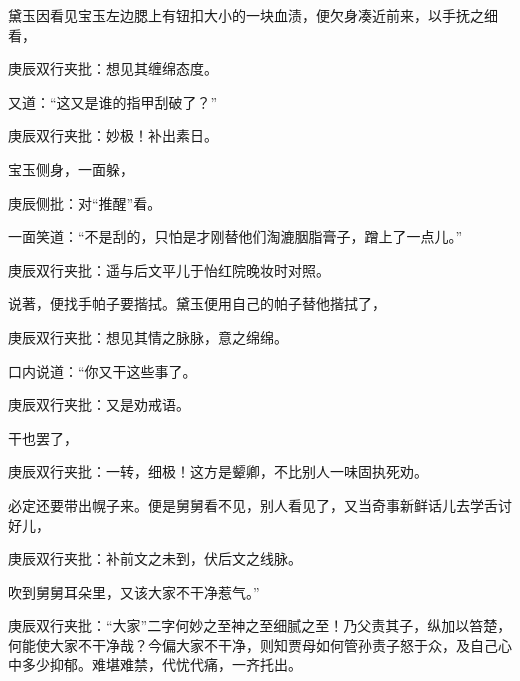 \begin{parag}
    黛玉因看见宝玉左边腮上有钮扣大小的一块血渍，便欠身凑近前来，以手抚之细看，\begin{note}庚辰双行夹批：想见其缠绵态度。\end{note}又道：“这又是谁的指甲刮破了？”\begin{note}庚辰双行夹批：妙极！补出素日。\end{note}宝玉侧身，一面躲，\begin{note}庚辰侧批：对“推醒”看。\end{note}一面笑道：“不是刮的，只怕是才刚替他们淘漉胭脂膏子，蹭上了一点儿。”\begin{note}庚辰双行夹批：遥与后文平儿于怡红院晚妆时对照。\end{note}说著，便找手帕子要揩拭。黛玉便用自己的帕子替他揩拭了，\begin{note}庚辰双行夹批：想见其情之脉脉，意之绵绵。\end{note}口内说道：“你又干这些事了。\begin{note}庚辰双行夹批：又是劝戒语。\end{note}干也罢了，\begin{note}庚辰双行夹批：一转，细极！这方是颦卿，不比别人一味固执死劝。\end{note}必定还要带出幌子来。便是舅舅看不见，别人看见了，又当奇事新鲜话儿去学舌讨好儿，\begin{note}庚辰双行夹批：补前文之未到，伏后文之线脉。\end{note}吹到舅舅耳朵里，又该大家不干净惹气。”\begin{note}庚辰双行夹批：“大家”二字何妙之至神之至细腻之至！乃父责其子，纵加以笞楚，何能使大家不干净哉？今偏大家不干净，则知贾母如何管孙责子怒于众，及自己心中多少抑郁。难堪难禁，代忧代痛，一齐托出。\end{note}
\end{parag}


